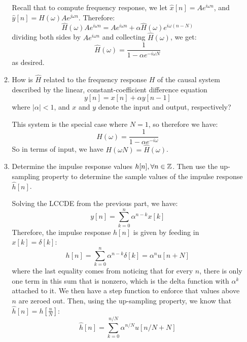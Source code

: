 \documentclass[10pt]{article}
\begin{document}
\begin{enumerate}[label=\alph*)]
\begin{enumerate}[label=\roman*)]
					\begin{solution}
						Recall that to compute frequency response, we let \( \hat{x}[n] = Ae^{i \omega n} \), 
						and \( \hat{y}[n] = H(\omega) Ae^{j \omega n} \). Therefore:
						\[
						\hat{H}(\omega)Ae^{i \omega n} = Ae^{i \omega n} + \alpha \hat{H}(\omega)e^{i \omega (n - N)}
						\] 
						dividing both sides by \( Ae^{i \omega n} \) and collecting \( \hat{H}(\omega) \), we get:
						\[
							\hat{H}(\omega) = \frac{1}{1 - \alpha e^{- i \omega N}}
						\] 
						as desired. 
					\end{solution}
				\item How is \( \hat{H} \) related to the frequency response \( H \) of the causal system 
					described by the linear, constant-coefficient difference equation
					\[
						y[n] = x[n] + \alpha y[n - 1]
					\] 
					where \( |\alpha| < 1 \), and \( x \) and \( y \) denote the input and output, respectively?

					\begin{solution}
						This system is the special case where \( N = 1 \), so therefore we have:
						\[
						H(\omega) = \frac{1}{1 - \alpha e^{-i \omega}}
						\] 
						So in terms of input, we have \( H(\omega N) = \hat{H}(\omega) \). 
					\end{solution}
				\item Determine the impulse response values \( h[n], \forall n\in \mathbb Z\). Then use the up-sampling 
					property to determine the sample values of the impulse response \( \hat{h}[n] \).

					\begin{solution}
						Solving the LCCDE from the previous part, we have:
						\[
							y[n] = \sum_{k=0}^{n} \alpha^{n-k}x[k]
						\] 
						Therefore, the impulse response \( h[n]\) is given by feeding in \( x[k] = \delta[k] \):
						\[
							h[n] = \sum_{k=0}^{n} \alpha ^{n - k}\delta[k] = \alpha ^{n}u[n + N]
						\] 
						where the last equality comes from noticing that for every \( n \), there is only  
						one term in this sum that is nonzero, which is the delta function with \( \alpha ^{k}\) 
						attached to it. We then have a step function to enforce that values above 
						\( n \) are zeroed out. 
						Then, using the up-sampling property, we know that \( \hat{h}[n] = h[\frac{n}{N}] \):
						\[
							\hat{h}[n] = \sum_{k=0}^{n / N} \alpha ^{n / N} u[n / N + N]
						\] 
					\end{solution}
			\end{enumerate}
	\end{enumerate}
	\pagebreak
\end{document}
